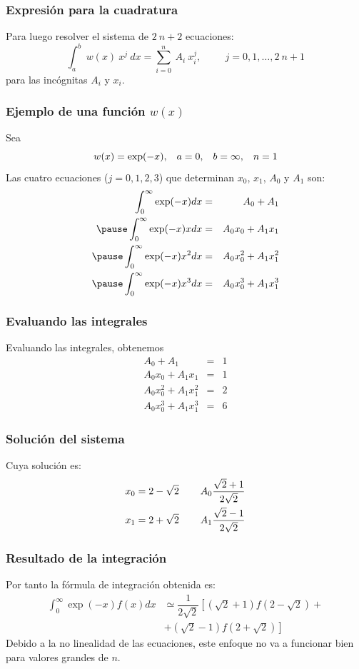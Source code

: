 \begin{frame}
\frametitle{Expresión para la cuadratura}
Para luego resolver el sistema de $2 \: n + 2$ ecuaciones:
\[ \int_{a}^{b} \: w(x) \: x^{j} \: dx = \sum_{i = 0}^{n} \: A_{i} \: x_{i}^{j}, \hspace{1cm} j = 0, 1, \ldots, 2 \: n + 1 \]
para las incógnitas $A_{i}$ y $x_{i}$.
\end{frame}
\begin{frame}
\frametitle{Ejemplo de una función $w(x)$}
Sea 
\[ w(x) = \exp(-x), \hspace{0.3cm} a = 0, \hspace{0.3cm} b = \infty , \hspace{0.3cm} n =  1\]
Las cuatro ecuaciones ($j= 0, 1, 2, 3$) que determinan $x_{0}$, $x_{1}$, $A_{0}$ y $A_{1}$ son:
\begin{eqnarray*}
\int_{0}^{\infty} \exp(-x) dx &=& A_{0}+A_{1} \\
\pause
\int_{0}^{\infty} \exp(-x) x dx &=& A_{0} x_{0} + A_{1} x_{1} \\
\pause
\int_{0}^{\infty} \exp(-x) x^{2} dx &=& A_{0} x_{0}^{2}+ A_{1} x_{1}^{2} \\
\pause
\int_{0}^{\infty} \exp(-x) x^{3} dx &=& A_{0} x_{0}^{3} + A_{1} x_{1}^{3} \\
\end{eqnarray*}
\end{frame}
\begin{frame}
\frametitle{Evaluando las integrales}
Evaluando las integrales, obtenemos
\begin{eqnarray*}
A_{0} + A_{1} &=& 1 \\
A_{0} x_{0} + A_{1} x_{1} &=& 1 \\
A_{0} x_{0}^{2} + A_{1} x_{1}^{2} &=& 2 \\
A_{0} x_{0}^{3} + A_{1} x_{1}^{3} &=& 6
\end{eqnarray*}
\end{frame}
\begin{frame}
\frametitle{Solución del sistema}
Cuya solución es:
\begin{eqnarray*}
x_{0} = 2 - \sqrt{2} \hspace{0.75cm} A_{0} \dfrac{\sqrt{2}+1}{2\sqrt{2}} \\
x_{1} = 2 + \sqrt{2} \hspace{0.75cm} A_{1} \dfrac{\sqrt{2}-1}{2\sqrt{2}}
\end{eqnarray*}
\end{frame}
\begin{frame}
\frametitle{Resultado de la integración}
Por tanto la fórmula de integración obtenida es:
\begin{eqnarray*}
\int_{0}^{\infty} \exp(-x) f(x) dx & \simeq \dfrac{1}{2\sqrt{2}} \left[ \left( \sqrt{2}+1 \right) f \left(2 - \sqrt{2}\right) + \right. \\ 
&+ \left. \left( \sqrt{2}-1 \right) f\left(2 +\sqrt{2} \right) \right]
\end{eqnarray*}
\pause
Debido a la no linealidad de las ecuaciones, este enfoque no va a funcionar bien para valores grandes de $n$.
\end{frame}
